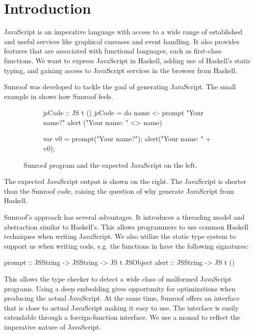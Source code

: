  
\section{Introduction}

JavaScript is an imperative language with access to a wide range
of established and useful services like graphical canvases and event
handling. It also provides features that are associated with 
functional languages, such as first-class functions. 
We want to express JavaScript in Haskell, adding use
of Haskell's static typing, and gaining access to JavaScript services
in the browser from Haskell.

Sunroof was developed to tackle the goal of generating JavaScript.
The small example in  
shows how Sunroof feels.
\begin{figure}
\centering
\begin{subfigure}{0.45\textwidth}%
\begin{Code}
 jsCode :: JS t ()
 jsCode = do
   name <- prompt "Your name?"
   alert ("Your name: " <> name)
\end{Code}%
\end{subfigure}%
\hfill%
\begin{subfigure}{0.45\textwidth}
\vspace{0.25cm}%
\begin{Code}
  
  
var v0 = prompt("Your name?"); 
alert("Your name: " + v0);
\end{Code}%
\end{subfigure}%
\caption{Sunroof program and the expected JavaScript on the left.}%
\label{fig:code-example}%
\vspace{0.5cm}%
\end{figure}
The expected JavaScript output is shown on the right. 
The JavaScript is shorter than the Sunroof code, raising
the question of why generate JavaScript from Haskell.

Sunroof's approach has several advantages. 
It introduces a threading model and abstraction similar
to Haskell's. This allows programmers to use common Haskell 
techniques when writing JavaScript.
We also utilize the static type system to support us when 
writing code, e.g. the functions
in  have the following signatures:
\begin{Code}
prompt :: JSString -> JSString -> JS t JSObject
alert  :: JSString -> JS t ()
\end{Code}
This allows the type checker to detect a wide class
of malformed JavaScript programs.
Using a deep embedding gives opportunity 
for optimizations when producing the actual JavaScript.
At the same time, Sunroof offers an interface that is 
close to actual JavaScript making it easy to use.
The interface is easily extendable through
a foreign-function interface.
We use a monad \cite{Moggi:91:ComputationMonads} 
to reflect the imperative nature of JavaScript.

